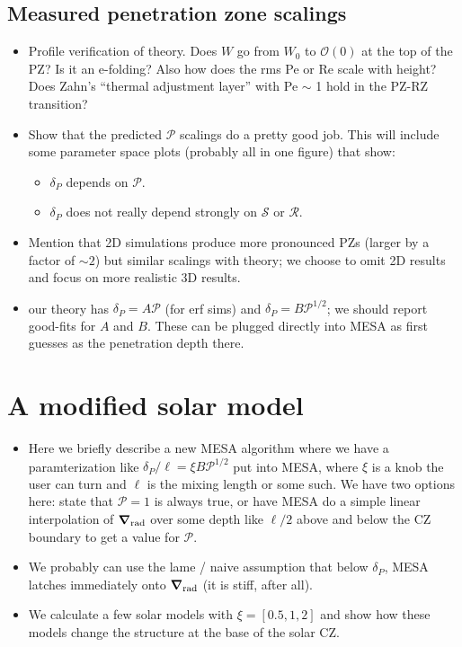\documentclass[12pt]{article}
\renewcommand{\vec}[1]{\boldsymbol{#1}}
\newcommand{\grad}{\vec{\nabla}}
\begin{document}
\subsection{Measured penetration zone scalings}
\begin{itemize}
\item Profile verification of theory.
Does $W$ go from $W_0$ to $\mathcal{O}(0)$ at the top of the PZ?
Is it an e-folding?
Also how does the rms Pe or Re scale with height?
Does Zahn's ``thermal adjustment layer'' with Pe $\sim$ 1 hold in the PZ-RZ transition?
\item Show that the predicted $\mathcal{P}$ scalings do a pretty good job.
This will include some parameter space plots (probably all in one figure) that show:
\begin{itemize}
\item $\delta_P$ depends on $\mathcal{P}$.
\item $\delta_P$ does not really depend strongly on $\mathcal{S}$ or $\mathcal{R}$.
\end{itemize}
\item Mention that 2D simulations produce more pronounced PZs (larger by a factor of $\sim 2$) but similar scalings with theory; we choose to omit 2D results and focus on more realistic 3D results.
\item our theory has $\delta_P = A \mathcal{P}$ (for erf sims) and $\delta_P = B \mathcal{P}^{1/2}$; we should report good-fits for $A$ and $B$.
These can be plugged directly into MESA as first guesses as the penetration depth there.
\end{itemize}



\section{A modified solar model}
\begin{itemize}
\item Here we briefly describe a new MESA algorithm where we have a paramterization like $\delta_P/\ell = \xi B \mathcal{P}^{1/2}$ put into MESA, where $\xi$ is a knob the user can turn and $\ell$ is the mixing length or some such.
We have two options here: state that $\mathcal{P} = 1$ is always true, or have MESA do a simple linear interpolation of $\grad_{\rm{rad}}$ over some depth like $\ell/2$ above and below the CZ boundary to get a value for $\mathcal{P}$.
\item We probably can use the lame / naive assumption that below $\delta_P$, MESA latches immediately onto $\grad_{\rm{rad}}$ (it is stiff, after all).
\item We calculate a few solar models with $\xi = [0.5, 1, 2]$ and show how these models change the structure at the base of the solar CZ.
\end{itemize}
\end{document}
